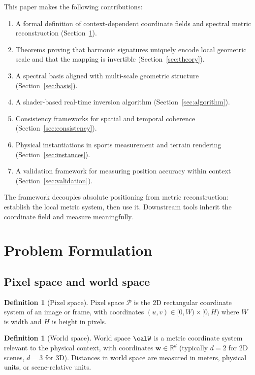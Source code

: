 \documentclass[11pt,twocolumn,a4paper]{article}
\theoremstyle{definition}
\newtheorem{definition}[theorem]{Definition}
\newcommand{\Real}{\mathbb{R}}
\newcommand{\calP}{\mathcal{P}}
\begin{document}
This paper makes the following contributions:

\begin{enumerate}[leftmargin=1.4em]
  \item A formal definition of context-dependent coordinate fields and spectral metric reconstruction (Section~\ref{sec:problem}).
  \item Theorems proving that harmonic signatures uniquely encode local geometric scale and that the mapping is invertible (Section~\ref{sec:theory}).
  \item A spectral basis aligned with multi-scale geometric structure (Section~\ref{sec:basis}).
  \item A shader-based real-time inversion algorithm (Section~\ref{sec:algorithm}).
  \item Consistency frameworks for spatial and temporal coherence (Section~\ref{sec:consistency}).
  \item Physical instantiations in sports measurement and terrain rendering (Section~\ref{sec:instances}).
  \item A validation framework for measuring position accuracy within context (Section~\ref{sec:validation}).
\end{enumerate}

The framework decouples absolute positioning from metric reconstruction: establish the local metric system, then use it. Downstream tools inherit the coordinate field and measure meaningfully.

\section{Problem Formulation}
\label{sec:problem}

\subsection{Pixel space and world space}

\begin{definition}[Pixel space]
\label{def:pixelspace}
Pixel space $\calP$ is the 2D rectangular coordinate system of an image or frame, with coordinates $(u, v) \in [0, W) \times [0, H)$ where $W$ is width and $H$ is height in pixels.
\end{definition}

\begin{definition}[World space]
\label{def:worldspace}
World space $\calW$ is a metric coordinate system relevant to the physical context, with coordinates $\bm{w} \in \Real^d$ (typically $d=2$ for 2D scenes, $d=3$ for 3D). Distances in world space are measured in meters, physical units, or scene-relative units.
\end{definition}
\end{document}
